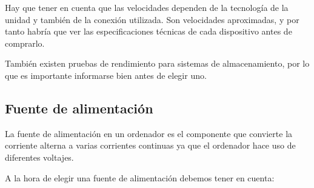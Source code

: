 Hay que tener en cuenta que las velocidades dependen de la tecnología de la unidad y también de la conexión utilizada. Son velocidades aproximadas, y por tanto habría que ver las especificaciones técnicas de cada dispositivo antes de comprarlo.


También existen pruebas de rendimiento para sistemas de almacenamiento, por lo que es importante informarse bien antes de elegir uno.


\subsection{Fuente de alimentación}

La fuente de alimentación en un ordenador es el componente que convierte la corriente alterna a varias corrientes continuas ya que el ordenador hace uso de diferentes voltajes.

A la hora de elegir una fuente de alimentación debemos tener en cuenta:

